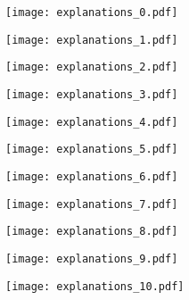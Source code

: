 \documentclass[varwidth,border=10pt]{standalone}
\begin{document}
\begin{figure}
\centering
\begin{subfigure}{.19\textwidth}
\centering\texttt{[image: explanations\_0.pdf]}
\end{subfigure}
%
\begin{subfigure}{.19\textwidth}
\centering\texttt{[image: explanations\_1.pdf]}
\end{subfigure}
%
\begin{subfigure}{.19\textwidth}
\centering\texttt{[image: explanations\_2.pdf]}
\end{subfigure}
%
\begin{subfigure}{.19\textwidth}
\centering\texttt{[image: explanations\_3.pdf]}
\end{subfigure}
%
\begin{subfigure}{.19\textwidth}
\centering\texttt{[image: explanations\_4.pdf]}
\end{subfigure}
%
\begin{subfigure}{.19\textwidth}
\centering\texttt{[image: explanations\_5.pdf]}
\end{subfigure}
%
\begin{subfigure}{.19\textwidth}
\centering\texttt{[image: explanations\_6.pdf]}
\end{subfigure}
%
\begin{subfigure}{.19\textwidth}
\centering\texttt{[image: explanations\_7.pdf]}
\end{subfigure}
%
\begin{subfigure}{.19\textwidth}
\centering\texttt{[image: explanations\_8.pdf]}
\end{subfigure}
%
\begin{subfigure}{.19\textwidth}
\centering\texttt{[image: explanations\_9.pdf]}
\end{subfigure}
%
\begin{subfigure}{.19\textwidth}
\centering\texttt{[image: explanations\_10.pdf]}
\end{subfigure}
%
\begin{subfigure}{.19\textwidth}

\end{subfigure}
\end{figure}
\end{document}
